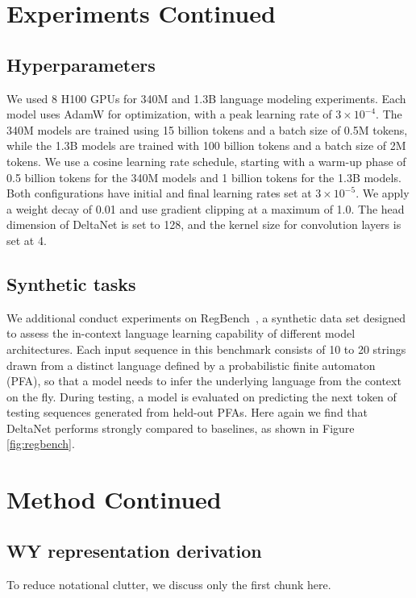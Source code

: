 \newpage

\section{Experiments Continued}
\subsection{Hyperparameters}
\label{sec:hyper}
We used 8 H100 GPUs for 340M and 1.3B language modeling experiments. Each model uses AdamW for optimization, with a peak learning rate of $3\times 10^{-4}$. The 340M models are trained using 15 billion tokens and a batch size of 0.5M tokens, while the 1.3B models are trained with 100 billion tokens and a batch size of 2M tokens. We use a cosine learning rate schedule, starting with a warm-up phase of 0.5 billion tokens for the 340M models and 1 billion tokens for the 1.3B models. Both configurations have initial and final learning rates set at $3\times 10^{-5}$. We apply a weight decay of 0.01 and use gradient clipping at a maximum of 1.0. The head dimension of DeltaNet is set to 128, and the kernel size for convolution layers is set at 4. 


\subsection{Synthetic tasks}
\label{sec:regbench}

We additional conduct experiments on RegBench~\citep{akyurek2024context},  a synthetic data set designed to assess the in-context language learning capability of different model architectures. Each input sequence in this benchmark consists of 10 to 20 strings drawn from a distinct language defined by a  probabilistic finite automaton (PFA), so that a model needs to infer the underlying language from the context on the fly.  During testing, a model is evaluated on
predicting the next token of testing sequences generated from held-out PFAs.  Here again we find that DeltaNet performs strongly compared to baselines, as shown in  Figure \ref{fig:regbench}. 


\section{Method Continued}
\subsection{WY representation derivation}
To reduce notational clutter, we discuss only the first chunk here.

